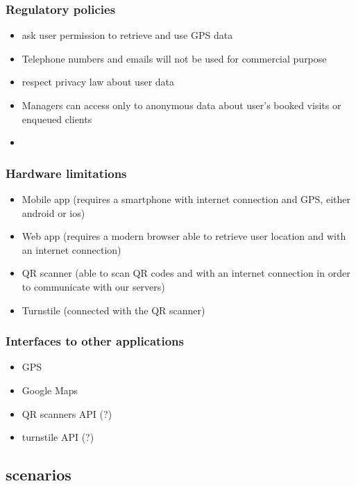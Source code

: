 \subsubsection{Regulatory policies}
\label{subsubsect:regulatorypolicies}

\begin{itemize}
    \item ask user permission to retrieve and use GPS data
    \item Telephone numbers and emails will not be used for commercial purpose
    \item respect privacy law about user data
    \item Managers can access only to anonymous data about user's booked visits or enqueued clients
    \item 
\end{itemize}

\subsubsection{Hardware limitations}
\label{subsubsect:hardwarelimitations}

\begin{itemize}
    \item Mobile app (requires a smartphone with internet connection and GPS, either android or ios)
    \item Web app (requires a modern browser able to retrieve user location and with an internet connection)
    \item QR scanner (able to scan QR codes and with an internet connection in order to communicate with our servers)
    \item Turnstile (connected with the QR scanner)
\end{itemize}


\subsubsection{Interfaces to other applications}
\label{subsubsect:interfacestootherappications}

\begin{itemize}
    \item GPS
    \item Google Maps
    \item QR scanners API (?)
    \item turnstile API (?)
\end{itemize}

\subsection{scenarios}
\label{subsubsect:scenarios}

